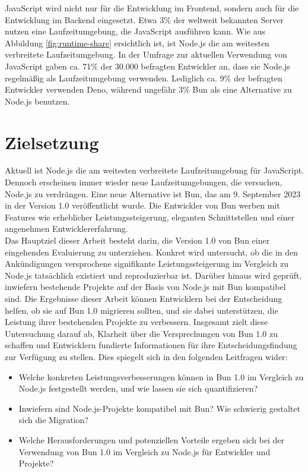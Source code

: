 \noindent
JavaScript wird nicht nur für die Entwicklung im Frontend, sondern auch für die Entwicklung im Backend 
eingesetzt. Etwa 3\% der weltweit bekannten Server nutzen eine Laufzeitumgebung, die JavaScript 
ausführen kann. \cite{QSuccess.2023} Wie aus Abbildung \ref{fig:runtime-share} ersichtlich ist, ist Node.js die am weitesten verbreitete Laufzeitumgebung. In der Umfrage zur aktuellen Verwendung von JavaScript gaben ca. 71\% der 30.000 befragten Entwickler an, dass sie Node.js regelmäßig als Laufzeitumgebung verwenden.
Lediglich ca. 9\% der befragten Entwickler verwenden Deno, während ungefähr 3\% Bun als eine Alternative zu Node.js benutzen. \cite{Greif.2022}


\section{Zielsetzung} \label{sec:introduction-target}
Aktuell ist Node.js die am weitesten verbreitete Laufzeitumgebung für JavaScript. Dennoch erscheinen immer wieder neue Laufzeitumgebungen, die versuchen, Node.js zu verdrängen. Eine neue Alternative ist Bun, das am 9. September 2023 in der Version 1.0 veröffentlicht wurde. Die Entwickler von Bun werben mit Features wie erheblicher Leistungssteigerung, eleganten Schnittstellen und einer angenehmen Entwicklererfahrung. \cite{Sumner.2023} \\

\noindent
Das Hauptziel dieser Arbeit besteht darin, die Version 1.0 von Bun einer eingehenden Evaluierung zu unterziehen. Konkret wird untersucht, ob die in den Ankündigungen versprochene signifikante Leistungssteigerung im Vergleich zu Node.js tatsächlich existiert und reproduzierbar ist. Darüber hinaus wird geprüft, inwiefern bestehende Projekte auf der Basis von Node.js mit Bun kompatibel sind. Die Ergebnisse dieser Arbeit können Entwicklern bei der Entscheidung helfen, ob sie auf Bun 1.0 migrieren sollten, und sie dabei unterstützen, die Leistung ihrer bestehenden Projekte zu verbessern. Insgesamt zielt diese Untersuchung darauf ab, Klarheit über die Versprechungen von Bun 1.0 zu schaffen und Entwicklern fundierte Informationen für ihre Entscheidungsfindung zur Verfügung zu stellen. Dies spiegelt sich in den folgenden Leitfragen wider:
\begin{itemize}
    \item Welche konkreten Leistungsverbesserungen können in Bun 1.0 im Vergleich zu Node.js festgestellt werden, und wie lassen sie sich quantifizieren?
    \item Inwiefern sind Node.js-Projekte kompatibel mit Bun? Wie schwierig gestaltet sich die Migration?
    \item Welche Herausforderungen und potenziellen Vorteile ergeben sich bei der Verwendung von Bun 1.0 im Vergleich zu Node.js für Entwickler und Projekte?
\end{itemize}

